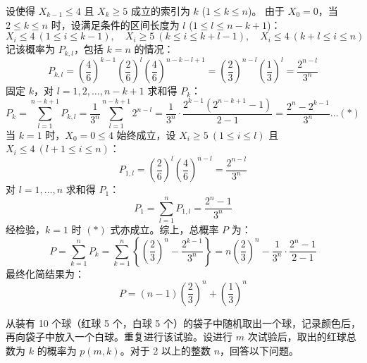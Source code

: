 \begin{questions}
\begin{solution}
    设使得 $X_{k-1} \le 4$ 且 $X_k \ge 5$ 成立的索引为 $k$ ($1 \le k \le n$)。
    由于 $X_0 = 0$，当 $2 \le k \le n$ 时，设满足条件的区间长度为 $l$ ($1 \le l \le n-k+1$)：
    \[
    X_i \le 4 \ (1 \le i \le k-1), \quad X_i \ge 5 \ (k \le i \le k+l-1), \quad X_i \le 4 \ (k+l \le i \le n)
    \]
    记该概率为 $P_{k,l}$，包括 $k=n$ 的情况：
    \[
    P_{k,l} = \left(\frac{4}{6}\right)^{k-1} \left(\frac{2}{6}\right)^l \left(\frac{4}{6}\right)^{n-k-l+1} = \left(\frac{2}{3}\right)^{n-l} \left(\frac{1}{3}\right)^l = \frac{2^{n-l}}{3^n}
    \]
    固定 $k$，对 $l = 1, 2, \dots, n-k+1$ 求和得 $P_k$：
    \[
    P_k = \sum_{l=1}^{n-k+1} P_{k,l} = \frac{1}{3^n} \sum_{l=1}^{n-k+1} 2^{n-l} = \frac{1}{3^n} \cdot \frac{2^{k-1}(2^{n-k+1}-1)}{2-1} = \frac{2^n - 2^{k-1}}{3^n} \dots (*)
    \]
    当 $k=1$ 时，$X_0=0 \le 4$ 始终成立，设 $X_i \ge 5 \ (1 \le i \le l)$ 且 $X_i \le 4 \ (l+1 \le i \le n)$：
    \[
    P_{1,l} = \left(\frac{2}{6}\right)^l \left(\frac{4}{6}\right)^{n-l} = \frac{2^{n-l}}{3^n}
    \]
    对 $l=1, \dots, n$ 求和得 $P_1$：
    \[
    P_1 = \sum_{l=1}^n P_{1,l} = \frac{2^n - 1}{3^n}
    \]
    经检验，$k=1$ 时 $(*)$ 式亦成立。综上，总概率 $P$ 为：
    \[
    P = \sum_{k=1}^n P_k = \sum_{k=1}^n \left\{ \left(\frac{2}{3}\right)^n - \frac{2^{k-1}}{3^n} \right\} = n\left(\frac{2}{3}\right)^n - \frac{1}{3^n} \cdot \frac{2^n-1}{2-1}
    \]
    最终化简结果为：
    \[
    P = (n-1)\left(\frac{2}{3}\right)^n + \left(\frac{1}{3}\right)^n
    \]
\end{solution}

\question 
从装有 10 个球（红球 5 个，白球 5 个）的袋子中随机取出一个球，记录颜色后，再向袋子中放入一个白球。重复进行该试验。设进行 $m$ 次试验后，取出的红球总数为 $k$ 的概率为 $p(m, k)$。对于 2 以上的整数 $n$，回答以下问题。

\end{questions}
